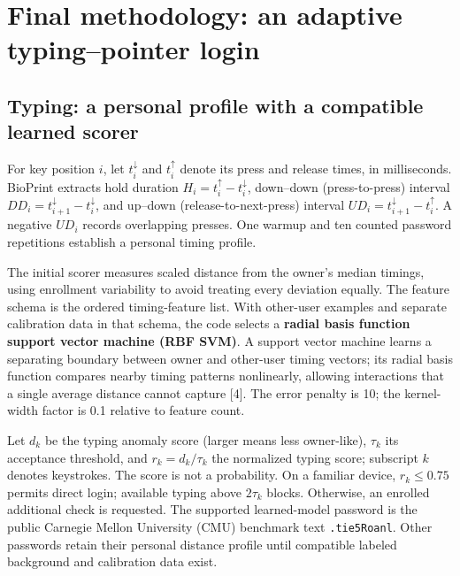 \documentclass[10pt,a4paper]{article}
\begin{document}
\newpage
\section{Final methodology: an adaptive typing--pointer login}
\subsection{Typing: a personal profile with a compatible learned scorer}
For key position $i$, let $t_i^{\downarrow}$ and $t_i^{\uparrow}$ denote its press and release times, in milliseconds. BioPrint extracts hold duration $H_i=t_i^{\uparrow}-t_i^{\downarrow}$, down--down (press-to-press) interval $DD_i=t_{i+1}^{\downarrow}-t_i^{\downarrow}$, and up--down (release-to-next-press) interval $UD_i=t_{i+1}^{\downarrow}-t_i^{\uparrow}$. A negative $UD_i$ records overlapping presses. One warmup and ten counted password repetitions establish a personal timing profile.

The initial scorer measures scaled distance from the owner's median timings, using enrollment variability to avoid treating every deviation equally. The feature schema is the ordered timing-feature list. With other-user examples and separate calibration data in that schema, the code selects a \textbf{radial basis function support vector machine (RBF SVM)}. A support vector machine learns a separating boundary between owner and other-user timing vectors; its radial basis function compares nearby timing patterns nonlinearly, allowing interactions that a single average distance cannot capture [4]. The error penalty is 10; the kernel-width factor is 0.1 relative to feature count.

Let $d_k$ be the typing anomaly score (larger means less owner-like), $\tau_k$ its acceptance threshold, and $r_k=d_k/\tau_k$ the normalized typing score; subscript $k$ denotes keystrokes. The score is not a probability. On a familiar device, $r_k\leq0.75$ permits direct login; available typing above $2\tau_k$ blocks. Otherwise, an enrolled additional check is requested. The supported learned-model password is the public Carnegie Mellon University (CMU) benchmark text \texttt{.tie5Roanl}. Other passwords retain their personal distance profile until compatible labeled background and calibration data exist.
\end{document}
